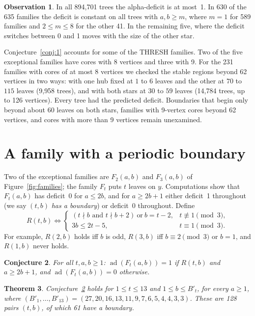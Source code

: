\documentclass[11pt]{amsart}
\newtheorem{theorem}{Theorem}
\newtheorem{conjecture}[theorem]{Conjecture}
\theoremstyle{definition}
\newtheorem{observation}[theorem]{Observation}
\newcommand{\ad}{\operatorname{ad}}
\begin{document}
\begin{observation}
In all 894{,}701 trees the alpha-deficit is at most~1. In 630 of the 635 families the deficit is constant on
all trees with $a,b\ge m$, where $m=1$ for 589 families and $2\le m\le 8$ for the other 41. In the remaining five,
where the deficit switches between 0 and 1 moves with the size of the other star.
\end{observation}

Conjecture~\ref{conj:1} accounts for some of the THRESH families. Two of the five exceptional families have
cores with 8 vertices and three with 9. For the 231 families with cores of at most 8 vertices we checked the
stable regions beyond 62 vertices in two ways: with one hub fixed at $1$ to $6$
leaves and the other at $70$ to $115$ leaves (9{,}958 trees), and with both stars at $30$ to $59$ leaves
(14{,}784 trees, up to 126 vertices). Every tree had the predicted deficit. Boundaries that begin only beyond
about 60 leaves on both stars, families with 9-vertex cores beyond 62 vertices, and cores with more than 9
vertices remain unexamined.

\section{A family with a periodic boundary}\label{sec:period}

Two of the exceptional families are $F_2(a,b)$ and $F_3(a,b)$ of Figure~\ref{fig:families}; the family $F_t$ puts
$t$ leaves on $y$. Computations show that $F_t(a,b)$ has deficit~0 for $a\le 2b$, and for
$a\ge 2b+1$ either deficit~1 throughout (we say $(t,b)$ \emph{has a boundary}) or deficit~0 throughout.
Define
\[
R(t,b) \iff
\begin{cases}
(t\nmid b \text{ and } t\nmid b+2)\ \text{or}\ b=t-2, & t\not\equiv 1 \pmod 3,\\[2pt]
3b\le 2t-5, & t\equiv 1\pmod 3.
\end{cases}
\]
For example, $R(2,b)$ holds iff $b$ is odd, $R(3,b)$ iff $b\equiv 2\pmod 3$ or $b=1$, and $R(1,b)$ never holds.

\begin{conjecture}\label{conj:period}
For all $t,a,b\ge 1$: $\ad(F_t(a,b))=1$ if $R(t,b)$ and $a\ge 2b+1$, and $\ad(F_t(a,b))=0$ otherwise.
\end{conjecture}

\begin{theorem}\label{thm:period}
Conjecture~\ref{conj:period} holds for $1\le t\le 13$ and $1\le b\le B'_t$, for every $a\ge1$, where
$(B'_1,\dots,B'_{13})=(27,20,16,13,11,9,7,6,5,4,4,3,3)$. These are 128 pairs $(t,b)$, of which 61 have a
boundary.
\end{theorem}
\end{document}
